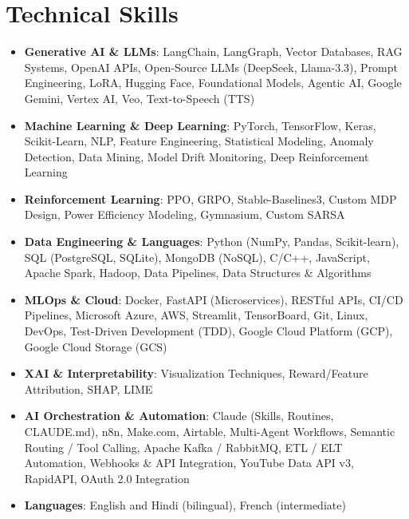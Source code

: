 \documentclass[letterpaper,10pt]{article}
\newcommand{\skill}[2]{\item \textbf{#1}: #2}
\begin{document}
\section{Technical Skills}
\begin{itemize}
  \skill{Generative AI \& LLMs}{LangChain, LangGraph, Vector Databases, RAG Systems, OpenAI APIs, Open-Source LLMs
        (DeepSeek, Llama-3.3), Prompt Engineering, LoRA, Hugging Face, Foundational Models, Agentic AI, Google Gemini,
        Vertex AI, Veo, Text-to-Speech (TTS)}
  \skill{Machine Learning \& Deep Learning}{PyTorch, TensorFlow, Keras, Scikit-Learn, NLP, Feature Engineering, Statistical
        Modeling, Anomaly Detection, Data Mining, Model Drift Monitoring, Deep Reinforcement Learning}
  \skill{Reinforcement Learning}{PPO, GRPO, Stable-Baselines3, Custom MDP Design, Power Efficiency Modeling, Gymnasium,
        Custom SARSA}
  \skill{Data Engineering \& Languages}{Python (NumPy, Pandas, Scikit-learn), SQL (PostgreSQL, SQLite), MongoDB (NoSQL),
        C/C++, JavaScript, Apache Spark, Hadoop, Data Pipelines, Data Structures \& Algorithms}
  \skill{MLOps \& Cloud}{Docker, FastAPI (Microservices), RESTful APIs, CI/CD Pipelines, Microsoft Azure, AWS, Streamlit,
        TensorBoard, Git, Linux, DevOps, Test-Driven Development (TDD), Google Cloud Platform (GCP), Google Cloud Storage (GCS)}
  \skill{XAI \& Interpretability}{Visualization Techniques, Reward/Feature Attribution, SHAP, LIME}
  \skill{AI Orchestration \& Automation}{Claude (Skills, Routines, CLAUDE.md), n8n, Make.com, Airtable, Multi-Agent Workflows,
        Semantic Routing / Tool Calling, Apache Kafka / RabbitMQ, ETL / ELT Automation, Webhooks \& API Integration,
        YouTube Data API v3, RapidAPI, OAuth 2.0 Integration}
  \skill{Languages}{English and Hindi (bilingual), French (intermediate)}
\end{itemize}
\end{document}
